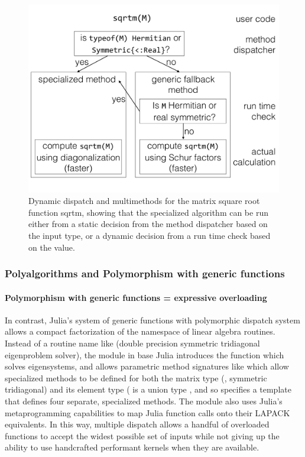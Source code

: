\documentclass[pldi]{sigplanconf-pldi15}
\begin{document}
\begin{figure}
	\centering
	\includegraphics[width=\columnwidth]{fig-sqrtm}
	\caption{Dynamic dispatch and multimethods for the matrix square root
	function sqrtm, showing that the specialized algorithm can be
	run either from a static decision from the method dispatcher based on
	the input type, or a dynamic decision from a run time check based on
	the value.}
	\label{fig:sqrtm}
\end{figure}


\subsubsection{Polyalgorithms and Polymorphism with generic functions}

\paragraph{Polymorphism with generic functions = expressive overloading}
In contrast, Julia's system of generic functions with polymorphic dispatch
system allows a compact factorization of the namespace of linear algebra
routines.  Instead of a routine name like  (double precision
symmetric tridiagonal eigenproblem solver), the  module in base
Julia introduces the function  which solves eigensystems, and allows
parametric method signatures like
 which allow specialized
methods to be defined for both the matrix type (,
symmetric tridiagonal) and its element type ( is a union type
, and so
 specifies a template that defines four separate,
specialized methods.  The  module also uses Julia's
metaprogramming capabilities to map Julia function calls onto their LAPACK
equivalents.  In this way, multiple dispatch allows a handful of overloaded
functions to accept the widest possible set of inputs while not giving up the
ability to use handcrafted performant kernels when they are available.
\end{document}

